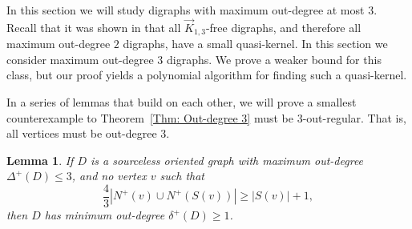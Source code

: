 \documentclass[12pt]{article}
\newtheorem{lemma}[theorem]{Lemma}
\theoremstyle{definition}
\begin{document}
In this section we will study digraphs with maximum out-degree at most $3$.
Recall that it was shown in \cite{ai2023results} that all $\Vec{K}_{1,3}$-free digraphs,
and therefore all maximum out-degree $2$ digraphs, have a small quasi-kernel.
In this section we consider maximum out-degree $3$ digraphs.
We prove a weaker bound for this class, but
our proof yields a polynomial algorithm for finding such a quasi-kernel.

In a series of lemmas that build on each other, we
will prove a smallest counterexample to Theorem~\ref{Thm: Out-degree 3} must be $3$-out-regular.
That is, all vertices must be out-degree $3$.

\begin{lemma}\label{Lemma: out-3, min-0}
   If $D$ is a sourceless oriented graph with maximum out-degree $\Delta^+(D)\leq 3$,
   and no vertex $v$ such that 
    \[
    \frac{4}{3}|N^+(v) \cup N^+(S(v))| \geq |S(v)|+1,
    \]
    then $D$ has minimum out-degree $\delta^+(D)\geq 1$.
\end{lemma}
\end{document}
